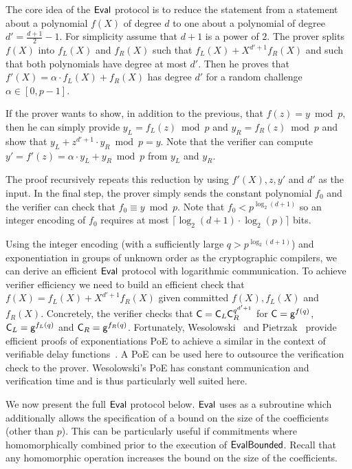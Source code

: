 \documentclass{article}
\theoremstyle{definition}
\begin{document}
The core idea of the $\textsf{{Eval}}$ protocol is to reduce the statement from a statement about a polynomial $f(X)$ of degree $d$ to one about a polynomial of degree $d'=\frac{d+1}{2}-1$. For simplicity assume that $d+1$ is a power of $2$.
The prover splits $f(X)$ into $f_L(X)$ and $f_R(X)$ such that $f_L(X)+X^{d'+1} f_R(X)$ and such that both polynomials have degree at most $d'$. Then he proves that $f'(X)=\alpha \cdot f_L(X) + f_R(X)$ has degree $d'$ for a random challenge $\alpha\in [0,p-1]$. 

If the prover wants to show, in addition to the previous, that $f(z)=y\bmod p$, then he can simply provide $y_L=f_L(z)\bmod p$ and $y_R=f_R(z)\bmod p$ and show that $y_L + z^{d'+1} \cdot y_R \bmod p=y$. Note that the verifier can compute $y' = f'(z) = \alpha \cdot y_L + y_R \bmod p$ from $y_L$ and $y_R$.

The proof recursively repeats this reduction by using $f'(X),z,y'$ and $d'$ as the input. In the final step, the prover simply sends the constant polynomial $f_0$ and the verifier can check that $f_0 \equiv y \bmod p$. Note that $f_0< p^{\log_2(d+1)}$ so an integer encoding of $f_0$ requires at most $\lceil \log_2(d+1) \cdot \log_2(p)\rceil$ bits.

Using the integer encoding (with a sufficiently large $q>p^{\log_2(d+1)}$) and exponentiation in groups of unknown order as the cryptographic compilers, we can derive an efficient $\textsf{{Eval}}$ protocol with logarithmic communication. To achieve verifier efficiency we need to build an efficient check that $f(X) = f_L(X) + X^{d'+1} f_R(X)$ given committed $f(X), f_L(X)$ and $f_R(X)$. Concretely, the verifier checks that $\mathsf{C} = \mathsf{C}_L \mathsf{C}_R^{q^{d'+1}}$ for $\mathsf{C}=\mathsf{g}^{f(q)}$, $\mathsf{C}_L=\mathsf{g}^{f_L(q)}$ and $\mathsf{C}_R=\mathsf{g}^{f_R(q)}$. Fortunately, Wesolowski~\cite{EC:Wesolowski19} and Pietrzak~\cite{EPRINT:Pietrzak18b} provide efficient proofs of exponentiations \textsf{PoE} to achieve a similar in the context of verifiable delay functions~\cite{C:BBBF18}. A \textsf{PoE} can be used here to outsource the verification check to the prover. Wesolowski's \textsf{PoE} has constant communication and verification time and is thus particularly well suited here.

We now present the full $\textsf{{Eval}}$ protocol below. $\textsf{{Eval}}$ uses as a subroutine  which additionally allows the specification of a bound on the size of the coefficients (other than $p$).  This can be particularly useful if commitments where homomorphically combined prior to the execution of $\textsf{{EvalBounded}}$. Recall that any homomorphic operation increases the bound on the size of the coefficients.
\end{document}
